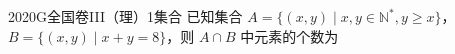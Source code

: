 
\begin{problem}{2020}{G}{全国卷III（理）}{1}{集合}
已知集合 $ A = \{(x,y) \mid x,y \in \mathbb{N}^*, y \geqslant x\} $，$ B = \{(x,y) \mid x + y = 8\} $，则 $ A \cap B $ 中元素的个数为
\begin{choices}
\end{choices}
\end{problem}

\begin{answer}

\end{answer}

\begin{solutions}

\end{solutions}